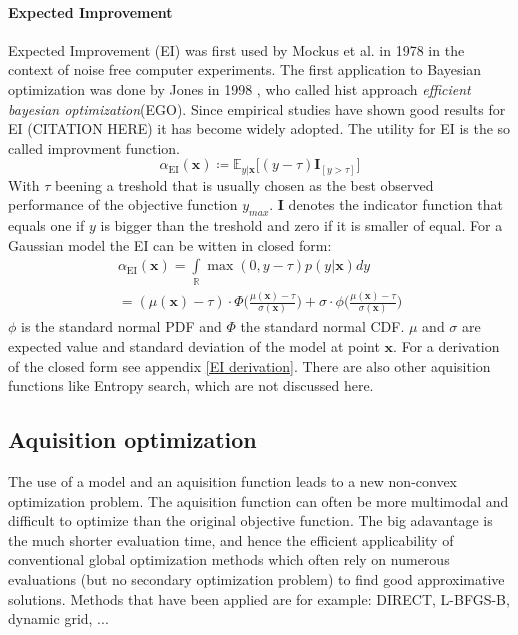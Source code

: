 \documentclass[english]{article}
\newcommand{\EI}{\operatorname{EI}}
\newcommand{\x}{\mathbf{x}}
\newcommand{\E}{\mathbb{E}}
\begin{document}
\paragraph{Expected Improvement}
Expected Improvement (EI) was first used by Mockus et al. in 1978 \cite{mockus_application_1978} in the context of noise free computer experiments. The first application to Bayesian optimization was done by Jones in 1998 \cite{jones_efficient_1998}, who called hist approach \textit{efficient bayesian optimization}(EGO). Since empirical studies have shown good results for EI (CITATION HERE) it has become widely adopted. The utility for EI is the so called improvment function.
\begin{equation}
  \alpha_{\EI}(\x) \coloneqq \E_{y|\x}\big[(y - \tau)\mathbf{I}_{[y > \tau]}\big]
\end{equation}
With $\tau$ beening a treshold that is usually chosen as the best observed performance of the objective function $y_{max}$. $\mathbf{I}$ denotes the indicator function that equals one if $y$ is bigger than the treshold and zero if it is smaller of equal. For a Gaussian model the EI can be witten in closed form:
\begin{equation}
  \begin{split}
    \alpha_{\EI}(\x) = \int\limits_{\mathbb{R}} \max(0, y-\tau)p(y|\x)dy
    \\
    = (\mu(\x) - \tau) \cdot \Phi \bigg(\frac{\mu(\x)-\tau}{\sigma(\x)}\bigg) + \sigma \cdot \phi \bigg(\frac{\mu(\x)-\tau}{\sigma(\x)}\bigg)
  \end{split}
\end{equation}
$\phi$ is the standard normal PDF and $\Phi$ the standard normal CDF. $\mu$ and $\sigma$ are expected value and standard deviation of the model at point $\x$.
For a derivation of the closed form see appendix \ref{EI derivation}.
There are also other aquisition functions like Entropy search, which are not discussed here.

\subsection*{Aquisition optimization}
The use of a model and an aquisition function leads to a new non-convex optimization problem. The aquisition function can often be more multimodal and difficult to optimize than the original objective function. The big adavantage is the much shorter evaluation time, and hence the efficient applicability of conventional global optimization methods which often rely on numerous evaluations (but no secondary optimization problem) to find good approximative solutions.
Methods that have been applied are for example: DIRECT, L-BFGS-B, dynamic grid, ...
\end{document}
